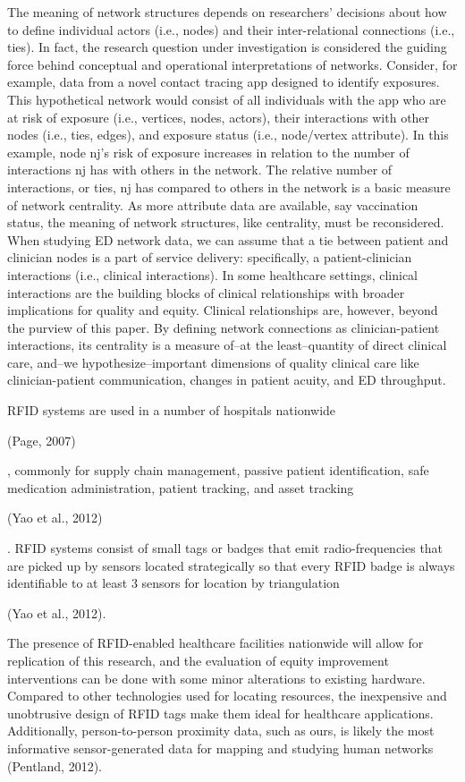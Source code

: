 \documentclass[
]{article}
\begin{document}
The meaning of network structures depends on researchers' decisions
about how to define individual actors (i.e., nodes) and their
inter-relational connections (i.e., ties). In fact, the research
question under investigation is considered the guiding force behind
conceptual and operational interpretations of networks. Consider, for
example, data from a novel contact tracing app designed to identify
exposures. This hypothetical network would consist of all individuals
with the app who are at risk of exposure (i.e., vertices, nodes,
actors), their interactions with other nodes (i.e., ties, edges), and
exposure status (i.e., node/vertex attribute). In this example, node
nj's risk of exposure increases in relation to the number of
interactions nj has with others in the network. The relative number of
interactions, or ties, nj has compared to others in the network is a
basic measure of network centrality. As more attribute data are
available, say vaccination status, the meaning of network structures,
like centrality, must be reconsidered. When studying ED network data, we
can assume that a tie between patient and clinician nodes is a part of
service delivery: specifically, a patient-clinician interactions (i.e.,
clinical interactions). In some healthcare settings, clinical
interactions are the building blocks of clinical relationships with
broader implications for quality and equity. Clinical relationships are,
however, beyond the purview of this paper. By defining network
connections as clinician-patient interactions, its centrality is a
measure of--at the least--quantity of direct clinical care, and--we
hypothesize--important dimensions of quality clinical care like
clinician-patient communication, changes in patient acuity, and ED
throughput.

RFID systems are used in a number of hospitals nationwide

(Page, 2007)

, commonly for supply chain management, passive patient identification,
safe medication administration, patient tracking, and asset tracking

(Yao et al., 2012)

. RFID systems consist of small tags or badges that emit
radio-frequencies that are picked up by sensors located strategically so
that every RFID badge is always identifiable to at least 3 sensors for
location by triangulation

(Yao et al., 2012).

The presence of RFID-enabled healthcare facilities nationwide will allow
for replication of this research, and the evaluation of equity
improvement interventions can be done with some minor alterations to
existing hardware. Compared to other technologies used for locating
resources, the inexpensive and unobtrusive design of RFID tags make them
ideal for healthcare applications. Additionally, person-to-person
proximity data, such as ours, is likely the most informative
sensor-generated data for mapping and studying human networks (Pentland,
2012).
\end{document}
